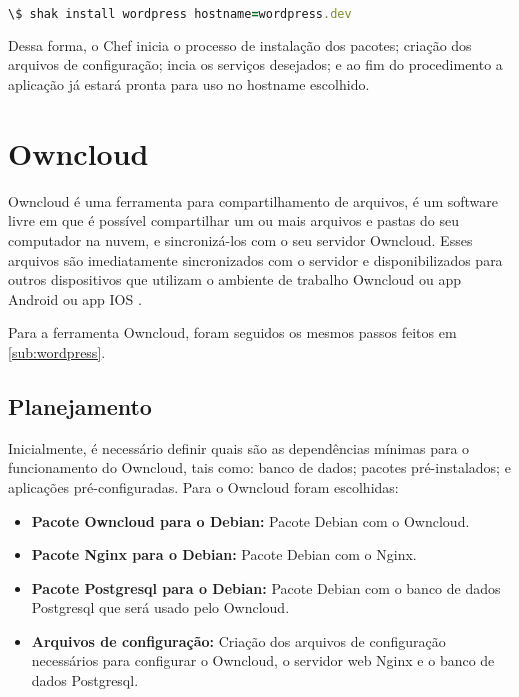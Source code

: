 \begin{lstlisting}[language=Ruby,label=dice_index,caption={Exemplo de exexução de instalação do wordpress com shak}]
\$ shak install wordpress hostname=wordpress.dev
\end{lstlisting}

Dessa forma, o Chef inicia o processo de instalação dos pacotes; criação dos arquivos
de configuração; incia os serviços desejados; e ao fim do procedimento a aplicação
já estará pronta para uso no hostname escolhido.

\section{Owncloud}
\label{sub:owncloud}

Owncloud é uma ferramenta para compartilhamento de arquivos, é um software 
livre em que é possível compartilhar
um ou mais arquivos e pastas do seu computador na nuvem, e sincronizá-los com o seu
servidor Owncloud. Esses arquivos são imediatamente sincronizados com o servidor
e disponibilizados para outros dispositivos que utilizam o ambiente de trabalho
Owncloud ou app Android ou app IOS \cite{owncloud} .

Para a ferramenta Owncloud, foram seguidos os mesmos passos feitos em 
\ref{sub:wordpress}.

\subsection{Planejamento}

Inicialmente, é necessário definir quais são as dependências
mínimas para o funcionamento do Owncloud, tais como: banco de dados; pacotes
pré-instalados; e aplicações pré-configuradas. Para o Owncloud foram escolhidas:

\begin{itemize}
   \item \textbf{Pacote Owncloud para o Debian:} Pacote Debian com o Owncloud.
   \item \textbf{Pacote Nginx para o Debian:} Pacote Debian com o Nginx.
   \item \textbf{Pacote Postgresql para o Debian:} Pacote Debian com o banco de dados Postgresql
   que será usado pelo Owncloud.
   \item \textbf{Arquivos de configuração:} Criação dos arquivos de configuração
   necessários para configurar o Owncloud, o servidor web Nginx e o banco de dados
   Postgresql.
\end{itemize}

